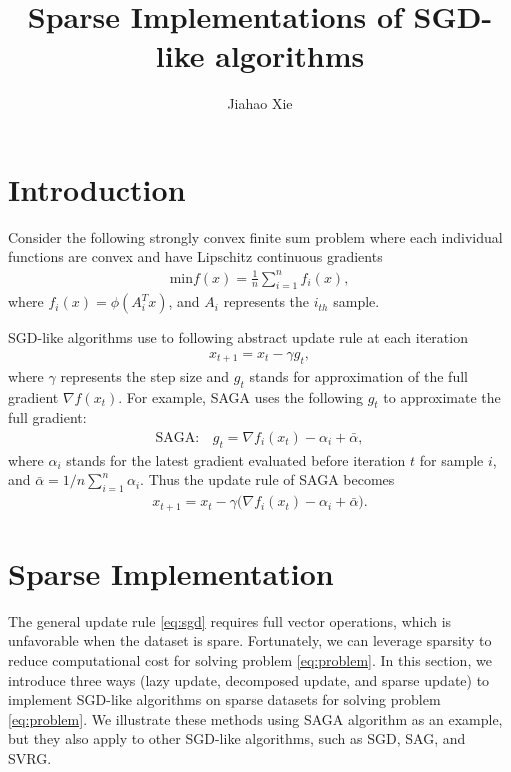 \documentclass{article}
\title{Sparse Implementations of SGD-like algorithms}
\author{Jiahao Xie}
\begin{document}
\maketitle

\section{Introduction}

Consider the following strongly convex finite sum problem where each individual functions are convex and have Lipschitz continuous gradients
\begin{equation} \label{eq:problem}
\begin{aligned}
    \mathrm{min} f(x) = \frac{1}{n} \sum_{i=1}^{n} f_i (x),
\end{aligned}
\end{equation}
where $f_i(x) = \phi(A_i^T x)$, and $A_i$ represents the $i_{th}$ sample.

SGD-like algorithms use to following abstract update rule at each iteration
\begin{equation} \label{eq:sgd}
\begin{aligned}
    x_{t+1} = x_{t} - \gamma g_{t},
\end{aligned}
\end{equation}
where $\gamma$ represents the step size and $g_{t}$ stands for approximation of the full gradient $\nabla f(x_t)$. For example, SAGA uses the following $g_{t}$ to approximate the full gradient:
\begin{equation} \label{eq:saga}
\begin{aligned}
    \mathrm{SAGA: } &g_{t} = \nabla f_i(x_t) - \alpha_i + \bar{\alpha},
\end{aligned}
\end{equation}
where $\alpha_i$ stands for the latest gradient evaluated before iteration $t$ for sample $i$, and $\bar{\alpha} = 1/n \sum_{i=1}^n \alpha_i$. Thus the update rule of SAGA becomes
\begin{equation} \label{eq:saga_rule}
\begin{aligned}
    x_{t+1} = x_{t} - \gamma \big( \nabla f_i(x_t) - \alpha_i + \bar{\alpha} \big).
\end{aligned}
\end{equation}


\section{Sparse Implementation}
The general update rule \eqref{eq:sgd} requires full vector operations, which is unfavorable when the dataset is spare. Fortunately, we can leverage sparsity to reduce computational cost for solving problem \eqref{eq:problem}. In this section, we introduce three ways (lazy update, decomposed update, and sparse update) to implement SGD-like algorithms on sparse datasets for solving problem \eqref{eq:problem}. We illustrate these methods using SAGA algorithm as an example, but they also apply to other SGD-like algorithms, such as SGD, SAG, and SVRG.
\end{document}
